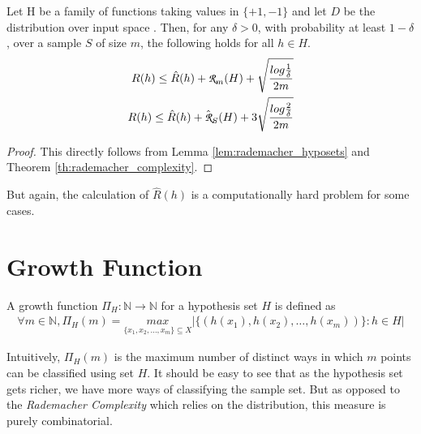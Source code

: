 \documentclass[../toml]{subfiles}
\begin{document}
\begin{theorem} \label{th:rademacher_bounds_binary_classification}
Let H be a family of functions taking values in $\{+1,-1\}$ and let $D$ be the distribution
over input space . Then, for any $\delta>0$, with probability at least $1-\delta$,
over a sample $S$ of size $m$, the following holds for all $h \in H$.
\begin{align}
R(h) \leq \hat{R}(h) + \cursive{R}_m(H) + \sqrt{\frac{log\frac{1}{\delta}}{2m}} \\
R(h) \leq \hat{R}(h) + \hat{\cursive{R}}_S(H) + 3\sqrt{\frac{log\frac{2}{\delta}}{2m}}
\end{align}
\end{theorem}
\begin{proof}
This directly follows from Lemma \ref{lem:rademacher_hyposets} and Theorem
\ref{th:rademacher_complexity}.
\end{proof}

But again, the calculation of $\hat{R}(h)$ is a computationally hard problem for some cases.

\section{Growth Function}

\begin{definition} \label{def:growth_fn}
A growth function $\Pi_H: \mathbb{N} \to \mathbb{N}$ for a hypothesis set $H$ is defined
as
\begin{align}
\forall m \in \mathbb{N}, \Pi_H(m) = \underset{\{x_1,x_2,\ldots,x_m\} \subseteq X}{max} \left| \{ \left( h(x_1),h(x_2),\ldots,h(x_m) \right) \} : h \in H \right|
\end{align}
\end{definition}

Intuitively, $\Pi_H(m)$ is the maximum number of distinct ways in which $m$ points can
be classified using set $H$. It should be easy to see that as the hypothesis set gets richer,
we have more ways of classifying the sample set. But as opposed to the
\textit{Rademacher Complexity} which relies on the distribution, this measure is purely
combinatorial.
\end{document}
